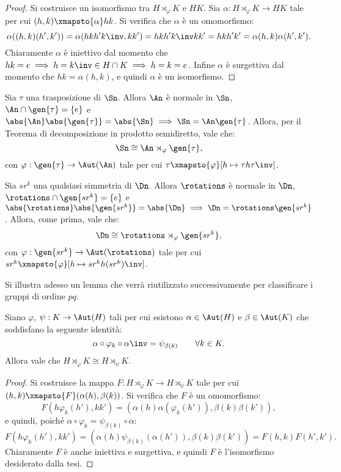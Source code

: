\documentclass[12pt]{scrartcl}
\begin{document}
	\begin{proof}
		Si costruisce un isomorfismo tra $H \rtimes_\varphi K$ e $HK$. Sia
		$\alpha : H \rtimes_\varphi K \to HK$ tale per cui
		$(h, k) \xmapsto{\alpha} hk$. Si verifica che $\alpha$ è un
		omomorfismo:
		\[ \alpha((h,k)(h',k')) = \alpha(h k h' k\inv, k k') =
			h k h' k\inv k k' = hkh'k' = \alpha(h,k)\alpha(h',k'). \]
		Chiaramente $\alpha$ è iniettivo dal momento che $hk=e \implies h = k\inv \in H \cap K \implies h = k = e$. Infine $\alpha$ è surgettiva dal momento che $hk = \alpha(h, k)$,
		e quindi $\alpha$ è un isomorfismo.
	\end{proof}
	
	\begin{example}[$\Sn \cong \An \rtimes_\varphi \gen{\tau}$]
		Sia $\tau$ una trasposizione di $\Sn$. Allora $\An$ è normale in $\Sn$,
		$\An \cap \gen{\tau} = \{e\}$ e $\abs{\An} \abs{\gen{\tau}} = \abs{\Sn} \implies
		\Sn = \An \gen{\tau}$. Allora, per il Teorema di decomposizione in prodotto
		semidiretto, vale che:
		\[ \Sn \cong \An \rtimes_\varphi \gen{\tau}, \]
		con $\varphi : \gen{\tau} \to \Aut(\An)$ tale per cui
		$\tau \xmapsto{\varphi} [h \mapsto \tau h \tau\inv]$.
	\end{example}
	
	\begin{example}
		Sia $sr^k$ una qualsiasi simmetria di $\Dn$. Allora $\rotations$ è normale in $\Dn$,
		$\rotations \cap \gen{sr^k} = \{e\}$ e $\abs{\rotations} \abs{\gen{s r^k}} = \abs{\Dn} \implies
		\Dn = \rotations \gen{s r^k}$. Allora, come prima, vale che:
		\[ \Dn \cong \rotations \rtimes_\varphi \gen{sr^k}, \]
		con $\varphi : \gen{s r^k} \to \Aut(\rotations)$ tale per cui
		$s r^k \xmapsto{\varphi} [h \mapsto sr^k h (sr^k)\inv]$.
	\end{example}
	
	Si illustra adesso un lemma che verrà riutilizzato successivamente per classificare
	i gruppi di ordine $pq$.
	
	\begin{nlemma}
		Siano $\varphi$, $\psi : K \to \Aut(H)$ tali per cui esistono
		$\alpha \in \Aut(H)$ e $\beta \in \Aut(K)$ che soddisfano la seguente
		identità:
		\[ \alpha \circ \varphi_k \circ \alpha\inv = \psi_{\beta(k)} \qquad \forall k \in K. \]
		Allora vale che $H \rtimes_\varphi K \cong H \rtimes_\psi K$.
	\end{nlemma}
	
	\begin{proof}
		Si costruisce la mappa $F : H \rtimes_\varphi K \to H \rtimes_\psi K$ tale
		per cui $(h, k) \xmapsto{F} (\alpha(h), \beta(k))$. Si verifica che $F$ è un omomorfismo:
		\[ F(h \varphi_k(h'), k k') = (\alpha(h) \alpha(\varphi_k(h')), \beta(k) \beta(k')), \]
		e quindi, poiché $\alpha \circ \varphi_k = \psi_{\beta(k)} \circ \alpha$:
		\[ F(h \varphi_k(h'), k k') = (\alpha(h)\psi_{\beta(k)}(\alpha(h')), \beta(k) \beta(k')) = F(h, k) F(h', k'). \]
		Chiaramente $F$ è anche iniettiva e surgettiva, e quindi $F$ è l'isomorfismo
		desiderato dalla tesi.
	\end{proof}
	
\end{document}
